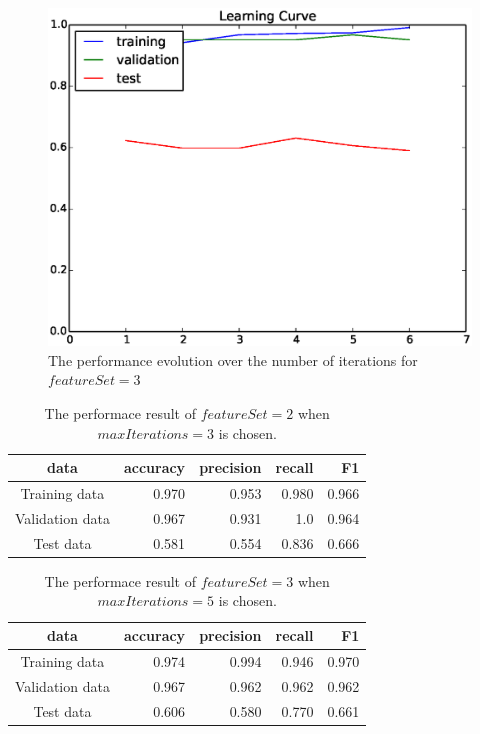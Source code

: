 \begin{figure}[b]
\centering
\includegraphics[width=130mm]{learning_curve_3}
\caption{The performance evolution over the number of iterations for $featureSet=3$}
\label{fig:learning_curve_3}
\end{figure}

\begin{table}[htb]
\centering
  \begin{tabular}{|c|r|r|r|r|} \hline
    data & accuracy & precision & recall & F1 \\ \hline
    Training data & 0.970 & 0.953 & 0.980 & 0.966 \\ \hline
    Validation data & 0.967 & 0.931 & 1.0 & 0.964 \\ \hline
    Test data & 0.581 & 0.554 & 0.836 & 0.666 \\ \hline
  \end{tabular}
  \caption{The performace result of $featureSet = 2$ when $maxIterations = 3$ is chosen.}
\end{table}

\begin{table}[htb]
\centering
  \begin{tabular}{|c|r|r|r|r|} \hline
    data & accuracy & precision & recall & F1 \\ \hline
    Training data & 0.974 & 0.994 & 0.946 & 0.970 \\ \hline
    Validation data & 0.967 & 0.962 & 0.962 & 0.962 \\ \hline
    Test data & 0.606 & 0.580 & 0.770 & 0.661 \\ \hline
  \end{tabular}
  \caption{The performace result of $featureSet = 3$ when $maxIterations = 5$ is chosen.}
\end{table}

